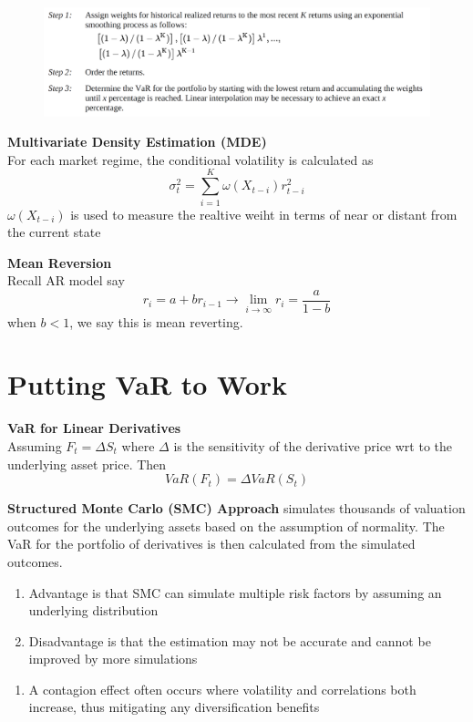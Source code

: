 \documentclass[11pt,fleqn]{book} %
\numberwithin{equation}{section} %
\numberwithin{figure}{section} %
\numberwithin{table}{section} %
\begin{document}
\begin{figure}[h!]
    \centering
    \includegraphics[scale=0.46]{hybrid.PNG}
\end{figure}
\begin{definition}\textbf{Multivariate Density Estimation (MDE)}\\
For each market regime, the conditional volatility is calculated as
$$
\sigma_t^2=\sum_{i=1}^K\omega(X_{t-i})r_{t-i}^2
$$
$\omega(X_{t-i})$ is used to measure the realtive weiht in terms of near or distant from the current state
\end{definition}
\begin{definition}\textbf{Mean Reversion}\\
Recall AR model say
$$
r_{i}=a+br_{i-1}\to \lim_{i\to\infty}r_i=\frac{a}{1-b}
$$
when $b<1$, we say this is mean reverting. 
\end{definition}
\chapter{Putting VaR to Work}
\begin{definition}\textbf{VaR for Linear Derivatives}\\
Assuming $F_t=\Delta S_t$ where $\Delta$ is the sensitivity of the derivative price wrt to the underlying asset price. Then
$$
VaR(F_t)=\Delta VaR(S_t)
$$
\end{definition}
\begin{definition}\textbf{Structured Monte Carlo (SMC) Approach} simulates thousands of valuation outcomes for the underlying assets based on the assumption of normality. The VaR for the portfolio of derivatives is then calculated from the simulated outcomes. 
\begin{enumerate}
    \item Advantage is that SMC can simulate multiple risk factors by assuming an underlying distribution
    \item Disadvantage is that the estimation may not be accurate and cannot be improved by more simulations
\end{enumerate}
\end{definition}
\begin{remark}
\begin{enumerate}
    \item A contagion effect often occurs where volatility and correlations both increase, thus mitigating any diversification benefits
\end{enumerate}
\end{remark}
\end{document}
